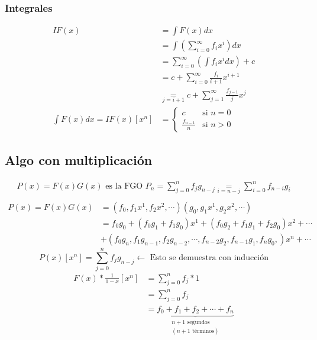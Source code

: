 \documentclass[../main.tex]{subfiles}
\begin{document}
\subsubsection{Integrales}%
\label{subsub:integrales}
\begin{align*}
	IF(x) &= \int F(x)dx\\
	&= \int
	\left(
		\sum_{i=0}^\infty f_ix^i
	\right)dx\\
	&= \sum_{i=0}^\infty
	\left(
		\int f_ix^idx
	\right)+c\\
	&= c+
	\sum_{i=0}^\infty
	\frac{f_i}{i+1}x^{i+1}\\
	& \underset
	{
		j=i+1
	}
	{
		=
	}
	c +
	\sum_{j=1}^\infty
	\frac{f_{j-1}}{j} x^j\\
	\int F(x)dx = IF(x)[x^n]
	&=
	\begin{cases}
		c &\text{si } n=0\\
		\frac{f_{n-1}}{n} &\text{si } n > 0
	\end{cases}
\end{align*}

\subsection{Algo con multiplicación}%
\label{sub:algo_con_multiplicacion}

\begin{gather*}
	P(x)=F(x)G(x) \text{ es la FGO }
	P_n = \sum_{j=0}^n f_j g_{n-j}
	\underset
	{
		i=n-j
	}
	{
		=
	}
	\sum_{i=0}^n f_{n-i}g_i\\
\end{gather*}
\begin{align*}
	P(x) = F(x)G(x)&=
	(
		f_0,
		f_1x^1,
		f_2x^2,
		\cdots
	)
	(
		g_0,
		g_1x^1,
		g_2x^2,
		\cdots
	)
	\\
	&= f_0g_0+
	(f_0g_1+f_1g_0)x^1
	+ (f_0g_2+f_1g_1+f_2g_0)x^2
	+\cdots\\
	&+
	(
	f_{0}g_{n},
	f_{1}g_{n-1},
	f_{2}g_{n-2},
	\cdots,
	f_{n-2}g_{2},
	f_{n-1}g_{1},
	f_{n}g_{0},
	)x^n + \cdots
\end{align*}
\[
	P(x) [x^n]
	= \sum_{j=0}^n
	f_jg_{n-j} \longleftarrow \text{ Esto se demuestra con inducción}
\]
\begin{align*}
	F(x)* \frac{1}{1-x} [x^n]
	&= \sum_{j=0}^n f_j*1\\
	&= \sum_{j=0}^n f_j\\
	&=
	\underbrace
	{
		f_0+f_1+f_2+\cdots+f_n
	}_
	{
		\substack
		{
			n+1\text{ segundos}\\
			(n+1\text{ términos})
		}
	}
\end{align*}
\end{document}
